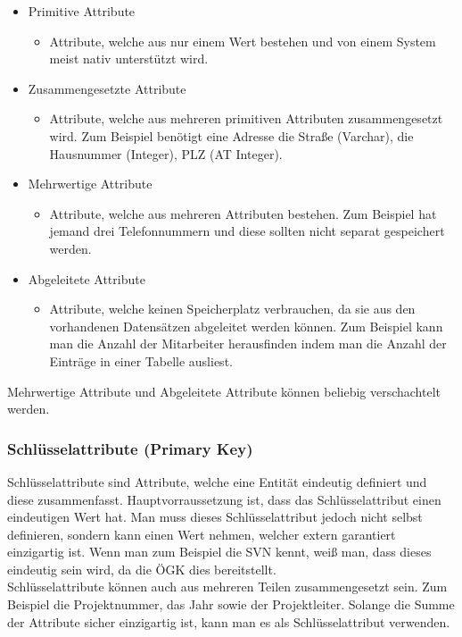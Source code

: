 \documentclass{article}
\begin{document}
	\begin{itemize}
		\item{Primitive Attribute}
		\begin{itemize}
			\item{Attribute, welche aus nur einem Wert bestehen und von einem System meist nativ unterstützt wird.}
		\end{itemize}
		\item{Zusammengesetzte Attribute}
		\begin{itemize}
			\item{Attribute, welche aus mehreren primitiven Attributen zusammengesetzt wird. Zum Beispiel benötigt eine Adresse die Straße (Varchar), die Hausnummer (Integer), PLZ (AT Integer).}
		\end{itemize}
		\item{Mehrwertige Attribute}
		\begin{itemize}
			\item{Attribute, welche aus mehreren Attributen bestehen. Zum Beispiel hat jemand drei Telefonnummern und diese sollten nicht separat gespeichert werden.}
		\end{itemize}
		\item{Abgeleitete Attribute}
		\begin{itemize}
			\item{Attribute, welche keinen Speicherplatz verbrauchen, da sie aus den vorhandenen Datensätzen abgeleitet werden können. Zum Beispiel kann man die Anzahl der Mitarbeiter herausfinden indem man die Anzahl der Einträge in einer Tabelle ausliest.}
		\end{itemize}
	\end{itemize}
	Mehrwertige Attribute und Abgeleitete Attribute können beliebig verschachtelt werden.
	\subsubsection{Schlüsselattribute (Primary Key)}
	Schlüsselattribute sind Attribute, welche eine Entität eindeutig definiert und diese zusammenfasst. Hauptvorraussetzung ist, dass das Schlüsselattribut einen eindeutigen Wert hat. Man muss dieses Schlüsselattribut jedoch nicht selbst definieren, sondern kann einen Wert nehmen, welcher extern garantiert einzigartig ist. Wenn man zum Beispiel die SVN kennt, weiß man, dass dieses eindeutig sein wird, da die ÖGK dies bereitstellt. \\
	Schlüsselattribute können auch aus mehreren Teilen zusammengesetzt sein. Zum Beispiel die Projektnummer, das Jahr sowie der Projektleiter. Solange die Summe der Attribute sicher einzigartig ist, kann man es als Schlüsselattribut verwenden. \\
\end{document}
